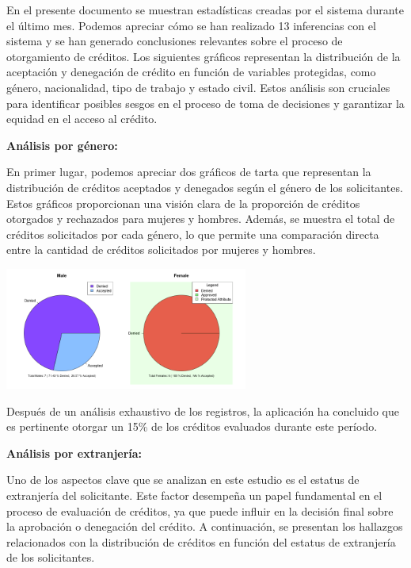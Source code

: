 \documentclass{article}
\begin{document}
\begin{multicols}{2}

En el presente documento se muestran estadísticas creadas por el sistema durante el último mes. Podemos apreciar cómo se han realizado {\huge 13 inferencias} con el sistema y se han generado conclusiones relevantes sobre el proceso de otorgamiento de créditos. Los siguientes gráficos representan la distribución de la aceptación y denegación de crédito en función de variables protegidas, como género, nacionalidad, tipo de trabajo y estado civil. Estos análisis son cruciales para identificar posibles sesgos en el proceso de toma de decisiones y garantizar la equidad en el acceso al crédito.

\vspace{0.5cm}
\textbf{Análisis por género:}

En primer lugar, podemos apreciar dos gráficos de tarta que representan la distribución de créditos aceptados y denegados según el género de los solicitantes. Estos gráficos proporcionan una visión clara de la proporción de créditos otorgados y rechazados para mujeres y hombres. Además, se muestra el total de créditos solicitados por cada género, lo que permite una comparación directa entre la cantidad de créditos solicitados por mujeres y hombres.

\begin{center} %
    \includegraphics[width=8cm]{tex/media/gender.png} 
\end{center}

Después de un análisis exhaustivo de los registros, la aplicación ha concluido que es pertinente {\huge otorgar un 15\%} de los créditos evaluados durante este período.

\vspace{0.5cm}
\textbf{Análisis por extranjería:}

Uno de los aspectos clave que se analizan en este estudio es el estatus de extranjería del solicitante. Este factor desempeña un papel fundamental en el proceso de evaluación de créditos, ya que puede influir en la decisión final sobre la aprobación o denegación del crédito. A continuación, se presentan los hallazgos relacionados con la distribución de créditos en función del estatus de extranjería de los solicitantes.



\end{multicols}
\end{document}
